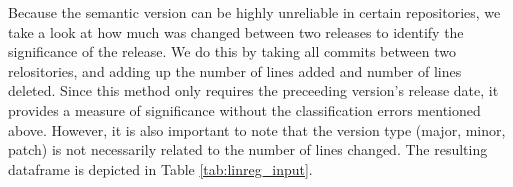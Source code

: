 \begin{table}
    \centering
    \caption{OLS regression input data. (b=before, a=after)}
    \label{tab:linreg_input}
\end{table}

Because the semantic version can be highly unreliable in certain repositories, we take a look at how much was changed between two releases to identify the significance of the release. We do this by taking all commits between two relositories, and adding up the number of lines added and number of lines deleted. Since this method only requires the preceeding version's release date, it provides a measure of significance without the classification errors mentioned above. However, it is also important to note that the version type (major, minor, patch) is not necessarily related to the number of lines changed. The resulting dataframe is depicted in Table \ref{tab:linreg_input}.

